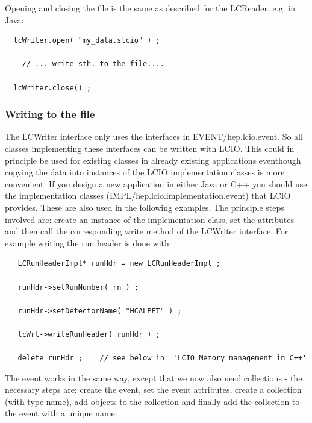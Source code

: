 \documentclass[twoside]{article}
\begin{document}
Opening and closing the file is the same as described for the LCReader, e.g. in Java:
\begin{verbatim}
  lcWriter.open( "my_data.slcio" ) ;

    // ... write sth. to the file....

  lcWriter.close() ;
\end{verbatim}

\subsubsection{Writing to the file}
The LCWriter interface only uses the interfaces in EVENT/hep.lcio.event. 
So all classes implementing these interfaces can be written with LCIO.
This could in principle be used for existing classes in already existing applications eventhough 
copying the data into instances of the LCIO implementation classes is more convenient.
If  you design a new application in either Java or C++ you should use the implementation
classes (IMPL/hep.lcio.implementation.event) that LCIO provides.
These are also used in the following examples. The principle steps involved are: 
create an instance of the implementation class, set the attributes and then call the corresponding
write method of the LCWriter interface.
For example writing the run header is done with:

\begin{verbatim}
   LCRunHeaderImpl* runHdr = new LCRunHeaderImpl ; 

   runHdr->setRunNumber( rn ) ;
   
   runHdr->setDetectorName( "HCALPPT" ) ;
   
   lcWrt->writeRunHeader( runHdr ) ;

   delete runHdr ;    // see below in  'LCIO Memory management in C++'
\end{verbatim}

The event works in the same way, except that we now also need collections - the necessary steps are:
create the event, set the event attributes, create a collection (with type name), add objects to the 
collection and finally add the collection to the event with a unique name:
\end{document}
